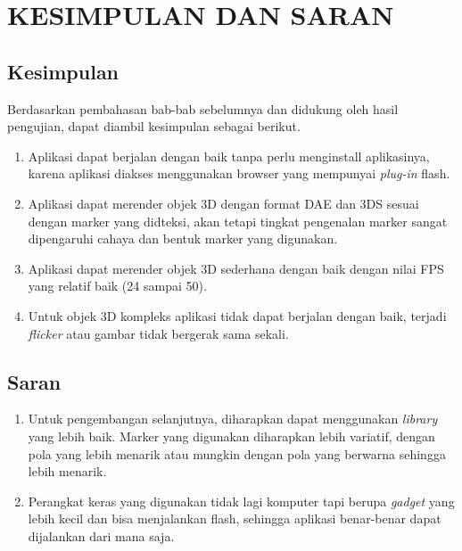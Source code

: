 \chapter{KESIMPULAN DAN SARAN}
\label{chap:penutup}
\section{Kesimpulan}
\label{sec:kesimpulan}
Berdasarkan pembahasan bab-bab sebelumnya dan didukung oleh hasil pengujian, dapat diambil kesimpulan sebagai berikut.
\begin{enumerate}
\item Aplikasi dapat berjalan dengan baik tanpa perlu menginstall aplikasinya, karena aplikasi diakses menggunakan browser yang mempunyai \textit{plug-in} flash. 
\item Aplikasi dapat merender objek 3D dengan format DAE dan 3DS sesuai dengan marker yang didteksi, akan tetapi tingkat pengenalan marker sangat dipengaruhi cahaya dan bentuk marker yang digunakan.
\item Aplikasi dapat merender objek 3D sederhana dengan baik dengan nilai FPS yang relatif baik (24 sampai 50). 
\item Untuk objek 3D kompleks aplikasi tidak dapat berjalan dengan baik, terjadi \textit{flicker} atau gambar tidak bergerak sama sekali.
\end{enumerate}

\section{Saran}
\label{sec:saran}
\begin{enumerate}
\item Untuk pengembangan selanjutnya, diharapkan dapat menggunakan \textit{library} yang lebih baik. Marker yang digunakan diharapkan lebih variatif, dengan pola yang lebih menarik atau mungkin dengan pola yang berwarna sehingga lebih menarik.
\item Perangkat keras yang digunakan tidak lagi komputer tapi berupa \textit{gadget} yang lebih kecil dan bisa menjalankan flash, sehingga aplikasi benar-benar dapat dijalankan dari mana saja. 
\end{enumerate}